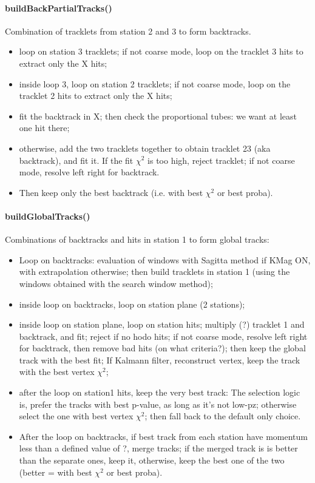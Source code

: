 \documentclass[11pt]{article}
\begin{document}
\paragraph{buildBackPartialTracks()}
Combination of tracklets from station 2 and 3 to form backtracks.
\begin{itemize}
\item{loop on station 3 tracklets; if not coarse mode, loop on the tracklet 3 hits to extract only the X hits;}
\item{inside loop 3, loop on station 2 tracklets; if not coarse mode, loop on the tracklet 2 hits to extract only the X hits;}
\item{fit the backtrack in X; then check the proportional tubes: we want at least one hit there;}
\item{otherwise, add the two tracklets together to obtain tracklet 23 (aka backtrack), and fit it. If the fit $\chi^2$ is too high, reject tracklet; if not coarse mode, resolve left right for backtrack.}
\item{Then keep only the best backtrack (i.e. with best $\chi^2$ or best proba).}
\end{itemize}


\paragraph{buildGlobalTracks()}
Combinations of backtracks and hits in station 1 to form global tracks:
\begin{itemize}
\item{Loop on backtracks: evaluation of windows with Sagitta method if KMag ON, with extrapolation otherwise; then build tracklets in station 1 (using the windows obtained with the search window method);}
\item{inside loop on backtracks, loop on station plane (2 stations);}
\item{inside loop on station plane, loop on station  hits; multiply (?) tracklet 1 and backtrack, and fit; reject if no hodo hits; if not coarse mode, resolve left right for backtrack, then remove bad hits (on what criteria?); then keep the global track with the best fit; If Kalmann filter, reconstruct vertex, keep the track with the best vertex $\chi^2$;}
\item{after the loop on station1 hits, keep the very best track: The selection logic is, prefer the tracks with best p-value, as long as it's not low-pz; otherwise select the one with best vertex $\chi^2$; then fall back to the default only choice.}
\item{After the loop on backtracks, if best track from each station have momentum less than a defined value of ?, merge tracks; if the merged track is is better than the separate ones, keep it, otherwise, keep the best one of the two (better = with best $\chi^2$ or best proba).}
\end{itemize}
\end{document}
